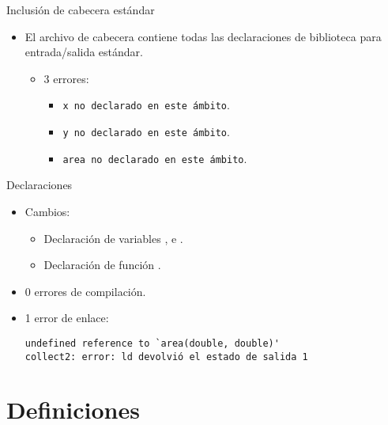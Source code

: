 \begin{frame}[fragile]{Inclusión de cabecera estándar}

\begin{itemize}
  \item El archivo de cabecera  contiene todas las declaraciones
        de biblioteca para entrada/salida estándar.
    \begin{itemize}
      \item 3 errores:
        \begin{itemize}
          \item \verb+x no declarado en este ámbito+.
          \item \verb+y no declarado en este ámbito+.
          \item \verb+area no declarado en este ámbito+.
        \end{itemize}
    \end{itemize}
\end{itemize}
\end{frame}

\begin{frame}[fragile]{Declaraciones}

\begin{itemize}
  \item Cambios:
    \begin{itemize}
      \item Declaración de variables , e .
      \item Declaración de función .
    \end{itemize}
  \item 0 errores de compilación.
  \item 1 error de enlace:
\begin{lstlisting}[style=terminal]
undefined reference to `area(double, double)'
collect2: error: ld devolvió el estado de salida 1
\end{lstlisting}
\end{itemize}
\end{frame}

\section{Definiciones}

